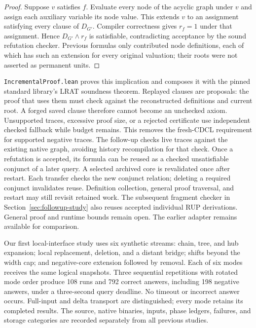 \documentclass[11pt,a4paper]{article}
\numberwithin{equation}{section}
\theoremstyle{plain}
\theoremstyle{definition}
\theoremstyle{remark}
\begin{document}
\begin{proof}
Suppose $v$ satisfies $f$. Evaluate every node of the acyclic graph under $v$ and assign each auxiliary variable its node value. This extends $v$ to an assignment satisfying every clause of $D_{G'}$. Compiler correctness gives $r_f=1$ under that assignment. Hence $D_{G'}\land r_f$ is satisfiable, contradicting acceptance by the sound refutation checker. Previous formulas only contributed node definitions, each of which has such an extension for every original valuation; their roots were not asserted as permanent units.
\end{proof}

\texttt{IncrementalProof.lean} proves this implication and composes it with the pinned standard library's LRAT soundness theorem. Replayed clauses are proposals: the proof that uses them must check against the reconstructed definitions and current root. A forged saved clause therefore cannot become an unchecked axiom. Unsupported traces, excessive proof size, or a rejected certificate use independent checked fallback while budget remains. This removes the fresh-CDCL requirement for supported negative traces. The follow-up checks live traces against the existing native graph, avoiding history recompilation for that check. Once a refutation is accepted, its formula can be reused as a checked unsatisfiable conjunct of a later query. A selected archived core is revalidated once after restart. Each transfer checks the new conjunct relation; deleting a required conjunct invalidates reuse. Definition collection, general proof traversal, and restart may still revisit retained work. The subsequent fragment checker in Section~\ref{sec:followup-study} also reuses accepted individual RUP derivations. General proof and runtime bounds remain open. The earlier adapter remains available for comparison.

Our first local-interface study uses six synthetic streams: chain, tree, and hub expansion; local replacement, deletion, and a distant bridge; shifts beyond the width cap; and negative-core extension followed by removal. Each of six modes receives the same logical snapshots. Three sequential repetitions with rotated mode order produce 108 runs and 792 correct answers, including 198 negative answers, under a three-second query deadline. No timeout or incorrect answer occurs. Full-input and delta transport are distinguished; every mode retains its completed results. The source, native binaries, inputs, phase ledgers, failures, and storage categories are recorded separately from all previous studies.
\end{document}
